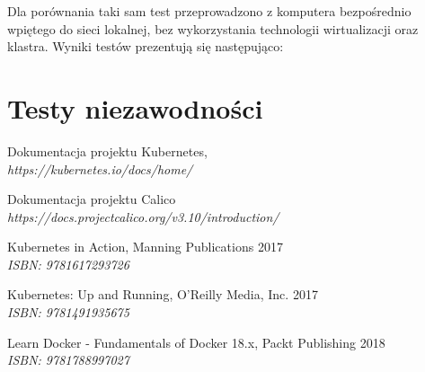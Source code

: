 \documentclass[pl,final,oneside]{mgr} %
\begin{document}
Dla porównania taki sam test przeprowadzono z komputera bezpośrednio wpiętego do sieci lokalnej, bez wykorzystania technologii wirtualizacji oraz klastra. Wyniki testów prezentują się następująco:




\section{Testy niezawodności}








\begin{thebibliography}{99}
	Dokumentacja projektu Kubernetes,
	\\ \textit{https://kubernetes.io/docs/home/}
	
	Dokumentacja projektu Calico \\
	\textit{https://docs.projectcalico.org/v3.10/introduction/}

	Kubernetes in Action, Manning Publications 2017 \\
	\textit{ISBN: 9781617293726}
	
	Kubernetes: Up and Running, O'Reilly Media, Inc. 2017 \\
	\textit{ISBN: 9781491935675}
	
	Learn Docker - Fundamentals of Docker 18.x, Packt Publishing 2018\\
	\textit{ISBN: 9781788997027}

\end{thebibliography}
\end{document}
